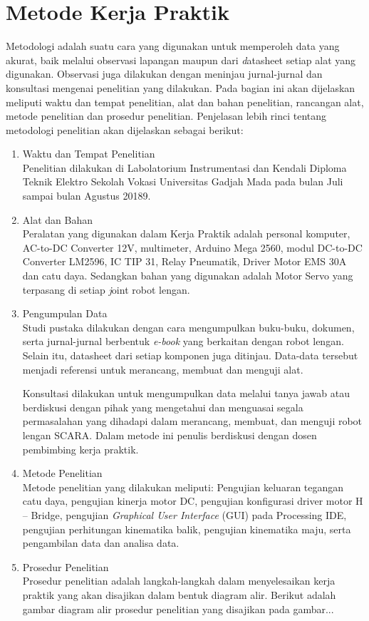 \section{Metode Kerja Praktik}
Metodologi adalah suatu cara yang digunakan untuk memperoleh data yang akurat, baik melalui observasi lapangan maupun dari \emph datasheet setiap alat yang digunakan. Observasi juga dilakukan dengan meninjau jurnal-jurnal dan konsultasi mengenai penelitian yang dilakukan. Pada bagian ini akan dijelaskan meliputi waktu dan tempat penelitian, alat dan bahan penelitian, rancangan alat, metode penelitian dan prosedur penelitian. Penjelasan lebih rinci tentang metodologi penelitian akan dijelaskan sebagai berikut: 

\begin{enumerate}
	\item Waktu dan Tempat Penelitian \\
	Penelitian dilakukan di Labolatorium Instrumentasi dan Kendali Diploma Teknik Elektro Sekolah Vokasi Universitas Gadjah Mada pada bulan Juli sampai bulan Agustus 20189.
	
	\item Alat dan Bahan \\
	Peralatan yang digunakan dalam Kerja Praktik adalah personal komputer, AC-to-DC Converter 12V, multimeter, Arduino Mega 2560, modul DC-to-DC Converter LM2596, IC TIP 31, Relay Pneumatik, Driver Motor EMS 30A dan catu daya. Sedangkan bahan yang digunakan adalah Motor Servo yang terpasang di setiap \emph joint robot lengan.
	
	\item  Pengumpulan Data \\
	Studi pustaka dilakukan dengan cara mengumpulkan buku-buku, dokumen, serta jurnal-jurnal berbentuk \emph{e-book} yang berkaitan dengan robot lengan. Selain itu, datasheet dari setiap komponen juga ditinjau. Data-data tersebut menjadi referensi untuk merancang, membuat dan menguji alat. 
	
	Konsultasi dilakukan untuk mengumpulkan data melalui tanya jawab atau berdiskusi dengan pihak yang mengetahui dan menguasai segala permasalahan yang dihadapi dalam merancang, membuat, dan menguji robot lengan SCARA. Dalam metode ini penulis berdiskusi dengan dosen pembimbing kerja praktik. 
	
	\item Metode Penelitian \\
	Metode penelitian yang dilakukan meliputi: Pengujian keluaran tegangan catu daya, pengujian kinerja motor DC, pengujian konfigurasi driver motor H – Bridge, pengujian \emph{Graphical User Interface }(GUI) pada Processing IDE, pengujian perhitungan kinematika balik, pengujian kinematika maju,  serta pengambilan data dan analisa data.
	
	\item Prosedur Penelitian\\
	Prosedur penelitian adalah langkah-langkah dalam menyelesaikan kerja praktik yang akan disajikan dalam bentuk diagram alir. Berikut adalah gambar diagram alir prosedur penelitian yang disajikan pada gambar...
\end{enumerate}


